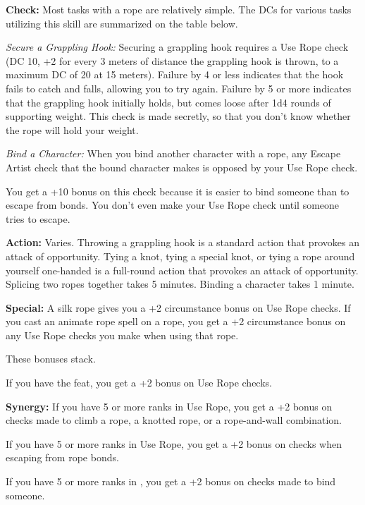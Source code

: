 \textbf{Check:} Most tasks with a rope are relatively simple. The DCs for various tasks utilizing this skill are summarized on the table below.


\textit{Secure a Grappling Hook:} Securing a grappling hook requires a Use Rope check (DC 10, +2 for every 3 meters of distance the grappling hook is thrown, to a maximum DC of 20 at 15 meters). Failure by 4 or less indicates that the hook fails to catch and falls, allowing you to try again. Failure by 5 or more indicates that the grappling hook initially holds, but comes loose after 1d4 rounds of supporting weight. This check is made secretly, so that you don't know whether the rope will hold your weight.

\textit{Bind a Character:} When you bind another character with a rope, any Escape Artist check that the bound character makes is opposed by your Use Rope check.

You get a +10 bonus on this check because it is easier to bind someone than to escape from bonds. You don't even make your Use Rope check until someone tries to escape.

\textbf{Action:} Varies. Throwing a grappling hook is a standard action that provokes an attack of opportunity. Tying a knot, tying a special knot, or tying a rope around yourself one-handed is a full-round action that provokes an attack of opportunity. Splicing two ropes together takes 5 minutes. Binding a character takes 1 minute.

\textbf{Special:} A silk rope gives you a +2 circumstance bonus on Use Rope checks. If you cast an animate rope spell on a rope, you get a +2 circumstance bonus on any Use Rope checks you make when using that rope.

These bonuses stack.

If you have the  feat, you get a +2 bonus on Use Rope checks.

\textbf{Synergy:} If you have 5 or more ranks in Use Rope, you get a +2 bonus on  checks made to climb a rope, a knotted rope, or a rope-and-wall combination.

If you have 5 or more ranks in Use Rope, you get a +2 bonus on  checks when escaping from rope bonds.

If you have 5 or more ranks in , you get a +2 bonus on checks made to bind someone.
